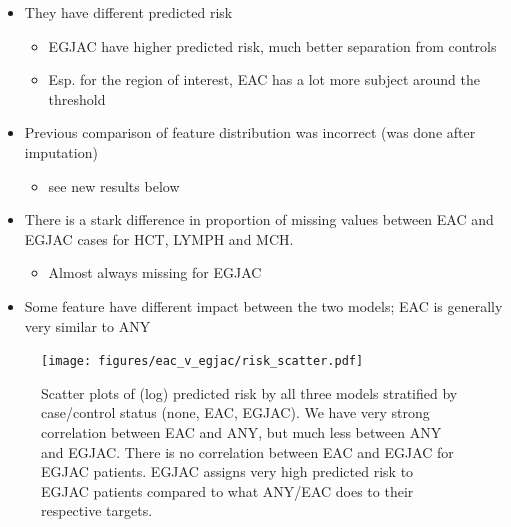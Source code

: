 \documentclass[12pt]{article}
\begin{document}
\begin{itemize}
	\item They have different predicted risk
	\begin{itemize}
		\item EGJAC have higher predicted risk, 
		much better separation from controls
		\item Esp. for the region of interest, EAC has a lot more subject around the threshold
	\end{itemize}
	\item Previous comparison of feature distribution was incorrect (was done after imputation)
	\begin{itemize}
		\item see new results below
	\end{itemize}
	\item There is a stark difference in proportion of missing values between EAC and EGJAC cases
	for HCT, LYMPH and MCH. 
	\begin{itemize}
		\item Almost always missing for EGJAC
	\end{itemize}
	\item Some feature have different impact between the two models; EAC is generally very similar to ANY
\end{itemize}


\begin{figure}[h]
\centering
\texttt{[image: figures/eac\_v\_egjac/risk\_scatter.pdf]}
\caption{Scatter plots of (log) predicted risk by all three models stratified by 
case/control status (none, EAC, EGJAC). We have very strong correlation between EAC and ANY, but
much less between ANY and EGJAC. There is no correlation between EAC and EGJAC for EGJAC patients. 
EGJAC assigns very high predicted risk to EGJAC patients compared to what ANY/EAC does to 
their respective targets.}
\end{figure}
\end{document}
